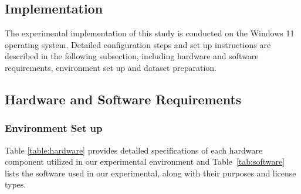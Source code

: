 \begin{ZhChapter}

    \chapter{Implementation}
    The experimental implementation of this study is conducted on the Windows 11 operating system. Detailed configuration steps and set up instructions are described in the following subsection, including hardware and software requirements, environment set up and dataset preparation.


    \section{Hardware  and Software Requirements}
    \subsection{Environment Set up}
    Table \ref{table:hardware} provides detailed specifications of each hardware component utilized in our experimental environment and Table~\ref{tab:software} lists the software used in our experimental, along with their purposes and license types.

    \begin{table}[htbp]
        \centering
        \caption{Hardware Requirements for the Experiment} \label{table:hardware}
    \end{table}


\end{ZhChapter}

